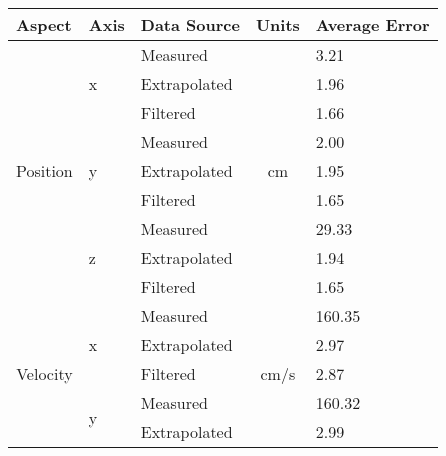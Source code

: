 \begin{table}[ht]
\centering
\begin{tabular}{@{}cllcl@{}}
\toprule
\multicolumn{1}{l}{Aspect}                    & Axis                   & Data Source  & \multicolumn{1}{l}{Units} & Average Error \\ \midrule
\multicolumn{1}{l}{\multirow{9}{*}{Position}} & \multirow{3}{*}{x}     & Measured     & \multirow{9}{*}{cm}       & 3.21          \\
\multicolumn{1}{l}{}                          &                        & Extrapolated &                           & 1.96          \\
\multicolumn{1}{l}{}                          &                        & Filtered     &                           & 1.66          \\
\multicolumn{1}{l}{}                          & \multirow{3}{*}{y}     & Measured     &                           & 2.00          \\
\multicolumn{1}{l}{}                          &                        & Extrapolated &                           & 1.95          \\
\multicolumn{1}{l}{}                          &                        & Filtered     &                           & 1.65          \\
\multicolumn{1}{l}{}                          & \multirow{3}{*}{z}     & Measured     &                           & 29.33         \\
\multicolumn{1}{l}{}                          &                        & Extrapolated &                           & 1.94          \\
\multicolumn{1}{l}{}                          &                        & Filtered     &                           & 1.65          \\ \midrule
\multirow{9}{*}{Velocity}                     & \multirow{3}{*}{x}     & Measured     & \multirow{9}{*}{cm/s}     & 160.35        \\
                                              &                        & Extrapolated &                           & 2.97          \\
                                              &                        & Filtered     &                           & 2.87          \\
                                              & \multirow{3}{*}{y}     & Measured     &                           & 160.32        \\
                                              &                        & Extrapolated &                           & 2.99          \\

\end{tabular}
\end{table}
